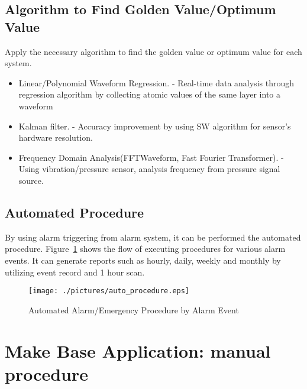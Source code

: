 \documentclass[11pt
  , letterpaper
  , article
  , oneside
  , showtrims
]{memoir}
\begin{document}
\section{Algorithm to Find Golden Value/Optimum Value}
Apply the necessary algorithm to find the golden value or optimum value for each system.

\begin{itemize}
	\item Linear/Polynomial Waveform Regression.
	\newline
	- Real-time data analysis through regression algorithm by collecting atomic values of the same layer into a waveform
	\item Kalman filter.
	\newline
	- Accuracy improvement by using SW algorithm for sensor's hardware resolution.
	\item Frequency Domain Analysis(FFTWaveform, Fast Fourier Transformer).
	\newline
	- Using vibration/pressure sensor, analysis frequency from pressure signal source.
\end{itemize}

\section{Automated Procedure}
By using alarm triggering from alarm system, it can be performed the automated procedure. Figure~\ref{fig:auto_procedure} shows the flow of executing procedures for various alarm events. It can generate reports such as hourly, daily, weekly and monthly by utilizing event record and 1 hour scan.

\begin{figure}[!hbt]
	\centering
	\texttt{[image: ./pictures/auto\_procedure.eps]}
	\caption{
		Automated Alarm/Emergency Procedure by Alarm Event
	}
	\label{fig:auto_procedure}   
\end{figure}

\newpage
\appendix
\newpage
\chapter{Make Base Application: manual procedure}
\renewcommand{\thechapter}{A}

\backmatter
%
%
%

%

\end{document}
